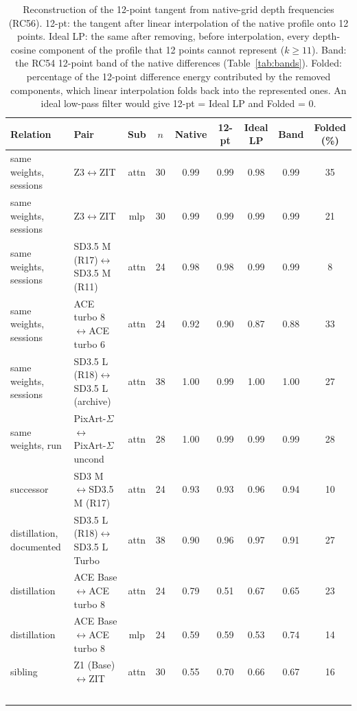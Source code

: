 \begin{table}[htbp]
\centering\scriptsize\setlength\tabcolsep{2pt}
\caption{Reconstruction of the 12-point tangent from native-grid depth frequencies (RC56). 12-pt: the tangent after linear interpolation of the native profile onto 12 points. Ideal LP: the same after removing, before interpolation, every depth-cosine component of the profile that 12 points cannot represent ($k\ge11$). Band: the RC54 12-point band of the native differences (Table~\ref{tab:bands}). Folded: percentage of the 12-point difference energy contributed by the removed components, which linear interpolation folds back into the represented ones. An ideal low-pass filter would give 12-pt = Ideal LP and Folded = 0.}
\label{tab:recon12}
\begin{tabularx}{\linewidth}{@{}>{\raggedright\arraybackslash}p{1.9cm}Lccccccc@{}}
\toprule
Relation & Pair & Sub & $n$ & Native & 12-pt & Ideal LP & Band & Folded (\%)\\
\midrule
same weights, sessions & Z3$\leftrightarrow$ZIT & attn & 30 & 0.99 & 0.99 & 0.98 & 0.99 & 35\\
same weights, sessions & Z3$\leftrightarrow$ZIT & mlp & 30 & 0.99 & 0.99 & 0.99 & 0.99 & 21\\
same weights, sessions & SD3.5 M (R17)$\leftrightarrow$SD3.5 M (R11) & attn & 24 & 0.98 & 0.98 & 0.99 & 0.99 & 8\\
same weights, sessions & ACE turbo 8$\leftrightarrow$ACE turbo 6 & attn & 24 & 0.92 & 0.90 & 0.87 & 0.88 & 33\\
same weights, sessions & SD3.5 L (R18)$\leftrightarrow$SD3.5 L (archive) & attn & 38 & 1.00 & 0.99 & 1.00 & 1.00 & 27\\
same weights, run & PixArt-$\Sigma$$\leftrightarrow$PixArt-$\Sigma$ uncond & attn & 28 & 1.00 & 0.99 & 0.99 & 0.99 & 28\\
successor & SD3 M$\leftrightarrow$SD3.5 M (R17) & attn & 24 & 0.93 & 0.93 & 0.96 & 0.94 & 10\\
distillation, documented & SD3.5 L (R18)$\leftrightarrow$SD3.5 L Turbo & attn & 38 & 0.90 & 0.96 & 0.97 & 0.91 & 27\\
distillation & ACE Base$\leftrightarrow$ACE turbo 8 & attn & 24 & 0.79 & 0.51 & 0.67 & 0.65 & 23\\
distillation & ACE Base$\leftrightarrow$ACE turbo 8 & mlp & 24 & 0.59 & 0.59 & 0.53 & 0.74 & 14\\
sibling & Z1 (Base)$\leftrightarrow$ZIT & attn & 30 & 0.55 & 0.70 & 0.66 & 0.67 & 16\\
$$
\end{tabularx}
\end{table}
